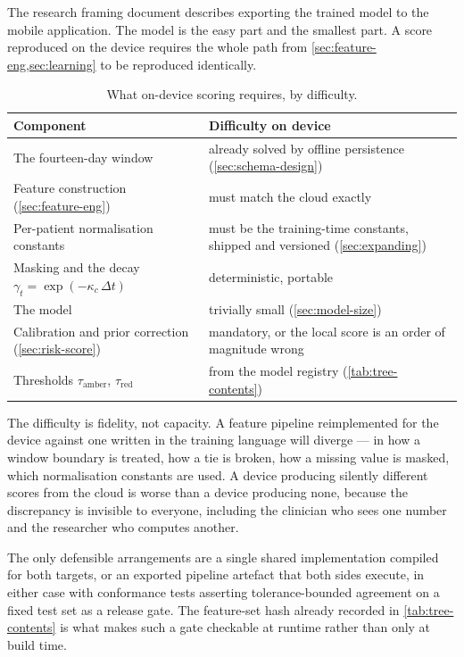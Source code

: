 \documentclass[12pt,a4paper,oneside]{report}
\begin{document}
The research framing document describes exporting the trained model to the mobile application. The model is the easy part and the smallest part. A score reproduced on the device requires the whole path from \cref{sec:feature-eng,sec:learning} to be reproduced identically.

\begin{table}[htbp]
\centering\small
\caption{What on-device scoring requires, by difficulty.}\label{tab:edge-requirements}
\begin{tabularx}{\textwidth}{@{}>{\raggedright\arraybackslash}p{6.4cm} X@{}}
\toprule
\textbf{Component} & \textbf{Difficulty on device} \\
\midrule
The fourteen-day window & already solved by offline persistence (\cref{sec:schema-design}) \\
Feature construction (\cref{sec:feature-eng}) & must match the cloud exactly \\
Per-patient normalisation constants & must be the training-time constants, shipped and versioned (\cref{sec:expanding}) \\
Masking and the decay $\gamma_t = \exp(-\kappa_c\,\Delta t)$ & deterministic, portable \\
The model & trivially small (\cref{sec:model-size}) \\
Calibration and prior correction (\cref{sec:risk-score}) & mandatory, or the local score is an order of magnitude wrong \\
Thresholds $\tau_{\text{amber}}$, $\tau_{\text{red}}$ & from the model registry (\cref{tab:tree-contents}) \\
\bottomrule
\end{tabularx}
\end{table}

The difficulty is fidelity, not capacity. A feature pipeline reimplemented for the device against one written in the training language will diverge --- in how a window boundary is treated, how a tie is broken, how a missing value is masked, which normalisation constants are used. A device producing silently different scores from the cloud is worse than a device producing none, because the discrepancy is invisible to everyone, including the clinician who sees one number and the researcher who computes another.

The only defensible arrangements are a single shared implementation compiled for both targets, or an exported pipeline artefact that both sides execute, in either case with conformance tests asserting tolerance-bounded agreement on a fixed test set as a release gate. The feature-set hash already recorded in \cref{tab:tree-contents} is what makes such a gate checkable at runtime rather than only at build time.
\end{document}
